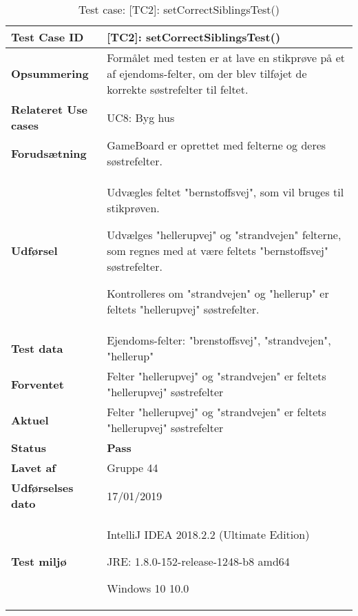 \documentclass[class=article, crop=false]{standalone}
\makeatletter
\let\savespace\@minipagetrue
\makeatother
\begin{document}
    \begin{table}[H]
        \caption{Test case: [TC2]: setCorrectSiblingsTest()}
        \begin{tabularx}{\textwidth}{|l|X|}
            \hline
            \textbf{Test Case ID }       & \textbf{[TC2]: setCorrectSiblingsTest()}   \\ \hline
            \textbf{Opsummering}         & Formålet med testen er at lave en stikprøve på et af ejendoms-felter, om der blev tilføjet de korrekte søstrefelter til feltet.  \\ \hline
            \textbf{Relateret Use cases}     & UC8: Byg hus \\ \hline
            \textbf{Forudsætning}& GameBoard er oprettet med felterne og deres søstrefelter.\\ \hline
            \textbf{Udførsel}            & \begin{tabenum}
                                               \item Udvægles feltet "bernstoffsvej", som vil bruges til stikprøven.
                                               \item Udvælges "hellerupvej" og "strandvejen" felterne, som regnes med at være feltets "bernstoffsvej" søstrefelter.
                                               \item Kontrolleres om "strandvejen" og "hellerup" er feltets "hellerupvej" søstrefelter.
            \end{tabenum} \\ \hline
            \textbf{Test data}           &  Ejendoms-felter: "brenstoffsvej", "strandvejen", "hellerup" \\ \hline
            \textbf{Forventet} & Felter "hellerupvej" og "strandvejen" er feltets "hellerupvej" søstrefelter\\    \hline
            \textbf{Aktuel} & Felter "hellerupvej" og "strandvejen" er feltets "hellerupvej" søstrefelter  \\ \hline
            \textbf{Status} & \textbf{Pass} \\ \hline
            \textbf{Lavet af} & Gruppe 44\\ \hline
            \textbf{Udførselses dato}  & 17/01/2019\\ \hline
            \textbf{Test miljø}  &  \savespace \begin{compactitem}
                                                   \item IntelliJ IDEA 2018.2.2 (Ultimate Edition)
                                                   \item JRE: 1.8.0-152-release-1248-b8 amd64
                                                   \item Windows 10 10.0
            \end{compactitem} \\ \hline
        \end{tabularx}
    \end{table}
\end{document}
